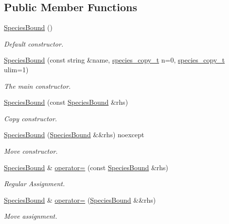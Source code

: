 \subsection*{Public Member Functions}
\begin{DoxyCompactItemize}
\item 
\hyperlink{classSpeciesBound_a30b5f99c24460658e62d96313e2a85d9}{Species\+Bound} ()
\begin{DoxyCompactList}\small\item\em Default constructor. \end{DoxyCompactList}\item 
\hyperlink{classSpeciesBound_aed911a49df201aa3f38869e06d0144ab}{Species\+Bound} (const string \&name, \hyperlink{common_8h_a3503f321fd36304ee274141275cca586}{species\+\_\+copy\+\_\+t} n=0, \hyperlink{common_8h_a3503f321fd36304ee274141275cca586}{species\+\_\+copy\+\_\+t} ulim=1)
\begin{DoxyCompactList}\small\item\em The main constructor. \end{DoxyCompactList}\item 
\hyperlink{classSpeciesBound_a7c20dcd943d0552bf62dd23434961462}{Species\+Bound} (const \hyperlink{classSpeciesBound}{Species\+Bound} \&rhs)
\begin{DoxyCompactList}\small\item\em Copy constructor. \end{DoxyCompactList}\item 
\hyperlink{classSpeciesBound_adaf343dde6acaee3b926e73044c7492f}{Species\+Bound} (\hyperlink{classSpeciesBound}{Species\+Bound} \&\&rhs) noexcept
\begin{DoxyCompactList}\small\item\em Move constructor. \end{DoxyCompactList}\item 
\hyperlink{classSpeciesBound}{Species\+Bound} \& \hyperlink{classSpeciesBound_a237e8e52a1ff76953741cdb6eef5c592}{operator=} (const \hyperlink{classSpeciesBound}{Species\+Bound} \&rhs)
\begin{DoxyCompactList}\small\item\em Regular Assignment. \end{DoxyCompactList}\item 
\hyperlink{classSpeciesBound}{Species\+Bound} \& \hyperlink{classSpeciesBound_a67abec4a830859a3e91e6eda705cc831}{operator=} (\hyperlink{classSpeciesBound}{Species\+Bound} \&\&rhs)
\begin{DoxyCompactList}\small\item\em Move assignment. \end{DoxyCompactList}\item 

\end{DoxyCompactItemize}
